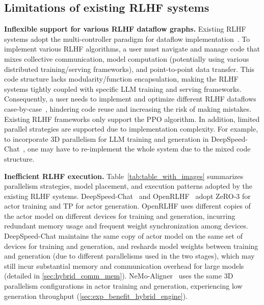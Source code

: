 \subsection{Limitations of existing RLHF systems}
\vspace{-1mm}
\noindent\textbf{Inflexible support for various RLHF dataflow graphs.}
Existing RLHF systems %
adopt the multi-controller paradigm for dataflow implementation~\cite{yao2023deepspeedchat, hu23openrlhf, NeMoAligner, xiao2023adaptive}. %
{To implement various RLHF algorithms,}
a user must navigate and manage code %
that mixes collective communication, model computation (potentially using various distributed training/serving frameworks), and point-to-point data transfer. %
This %
code structure lacks %
modularity/function encapsulation, making the RLHF systems tightly coupled with specific LLM training and serving frameworks.
Consequently, a user needs to implement and optimize different RLHF dataflows case-by-case~\cite{liang2021rllib}, hindering code reuse and increasing the risk of making mistakes. Existing RLHF frameworks only support the PPO algorithm.
In addition, limited parallel strategies are supported due to implementation complexity. For example, to incorporate 3D parallelism for LLM training and generation
in DeepSpeed-Chat~\cite{yao2023deepspeedchat}, one may have to re-implement the whole system due to the mixed code structure.


\noindent\textbf{Inefficient RLHF execution.} %
Table~\ref{tab:table_with_images} summarizes parallelism strategies, model placement, and execution patterns adopted by the existing RLHF systems. %
DeepSpeed-Chat~\cite{yao2023deepspeedchat} and OpenRLHF~\cite{hu23openrlhf} adopt ZeRO-3 for actor training and TP for actor generation.
OpenRLHF uses different copies of the actor model on different devices for training and generation,
incurring redundant memory usage and frequent weight synchronization among devices.
DeepSpeed-Chat maintains the same copy of actor model on the same set of devices for training and generation, %
and reshards model weights between training and generation (due to different parallelisms used in the two stages), %
which may still incur substantial {memory and communication} overhead 
for large models (detailed in \textsection\ref{sec:hybrid_comm_mem}). 
NeMo-Aligner~\cite{NeMoAligner} uses the same 3D parallelism configurations in actor training and generation, %
experiencing low generation throughput  (\textsection\ref{sec:exp_benefit_hybrid_engine}).

